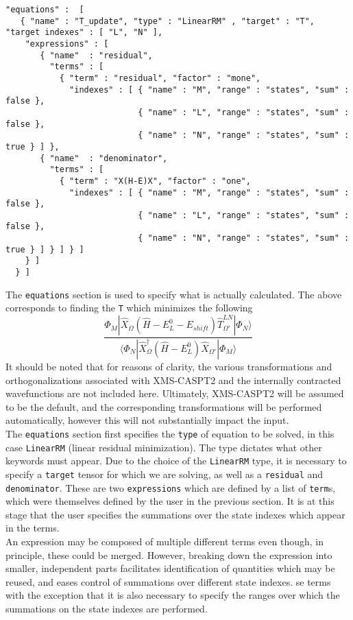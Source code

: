 \begin{lstlisting}[label={lst:equations}]
"equations" :  [
   { "name" : "T_update", "type" : "LinearRM" , "target" : "T", "target indexes" : [ "L", "N" ],
    "expressions" : [
       { "name"  : "residual",
         "terms" : [
           { "term" : "residual", "factor" : "mone",
             "indexes" : [ { "name" : "M", "range" : "states", "sum" : false },
                           { "name" : "L", "range" : "states", "sum" : false },
                           { "name" : "N", "range" : "states", "sum" : true } ] },
       { "name"  : "denominator",
         "terms" : [
           { "term" : "X(H-E)X", "factor" : "one",                                                 
             "indexes" : [ { "name" : "M", "range" : "states", "sum" : false },
                           { "name" : "L", "range" : "states", "sum" : false },
                           { "name" : "N", "range" : "states", "sum" : true } ] } ] } ]
    } ]
  } ]
\end{lstlisting}         
The \texttt{equations} section is used to specify what is actually calculated. The above corresponds to
finding the \texttt{T} which minimizes the following
\begin{equation}
\frac{ \Phi_{M} |  \hat{X}_{\Omega} ( \hat{H}-E^{0}_{L}-E_{shift} )  \hat{T}^{LN}_{\Omega'} | \Phi_{N} \rangle } 
{ \langle \Phi_{N}   | \hat{X}^{\dagger}_{\Omega}
                     ( \hat{H}- E^{0}_{L} )
                       \hat{X}_{\Omega'} |
 \Phi_{M} \rangle}
\end{equation}
It should be noted that for reasons of clarity, the various transformations and orthogonalizations associated
with XMS-CASPT2 and the internally contracted wavefunctions are not included here. Ultimately, XMS-CASPT2
will be assumed to be the default, and the corresponding transformations will be performed automatically, however
this will not substantially impact the input. \\

\noindent The  \texttt{equations} section first specifies the \texttt{type} of equation to be solved, in
this case \texttt{LinearRM} (linear residual minimization). The type dictates what other keywords must appear.
Due to the choice of the \texttt{LinearRM} type, it is necessary to specify a \texttt{target} tensor for 
which we are solving, as well as a \texttt{residual} and \texttt{denominator}. These are two \texttt{expressions}
which are defined by a list of \texttt{term}s, which were themselves defined by the user in the previous section. 
It is at this stage that the user specifies the summations over the state indexes which appear in the terms.\\

\noindent An expression may be composed of multiple different terms even though, in principle, these could be merged.
However, breaking down the expression into smaller, independent parts facilitates identification of
quantities which may be reused, and eases control of summations over different state indexes. 
se terms with the exception that it is also necessary to specify the ranges over
which the summations on the state indexes are performed.
